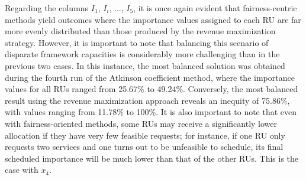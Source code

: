 \documentclass[preprint,12pt]{elsarticle}
\begin{document}
Regarding the columns $I_1$, $I_i$, ..., $I_5$, it is once again evident that fairness-centric methods yield outcomes where the importance values assigned to each RU are far more evenly distributed than those produced by the revenue maximization strategy. However, it is important to note that balancing this scenario of disparate framework capacities is considerably more challenging than in the previous two cases. In this instance, the most balanced solution was obtained during the fourth run of the Atkinson coefficient method, where the importance values for all RUs ranged from 25.67\% to 49.24\%. Conversely, the most balanced result using the revenue maximization approach reveals an inequity of 75.86\%, with values ranging from 11.78\% to 100\%. It is also important to note that even with fairness-oriented methods, some RUs may receive a significantly lower allocation if they have very few feasible requests; for instance, if one RU only requests two services and one turns out to be unfeasible to schedule, its final scheduled importance will be much lower than that of the other RUs. This is the case with $x_4$.
\end{document}
